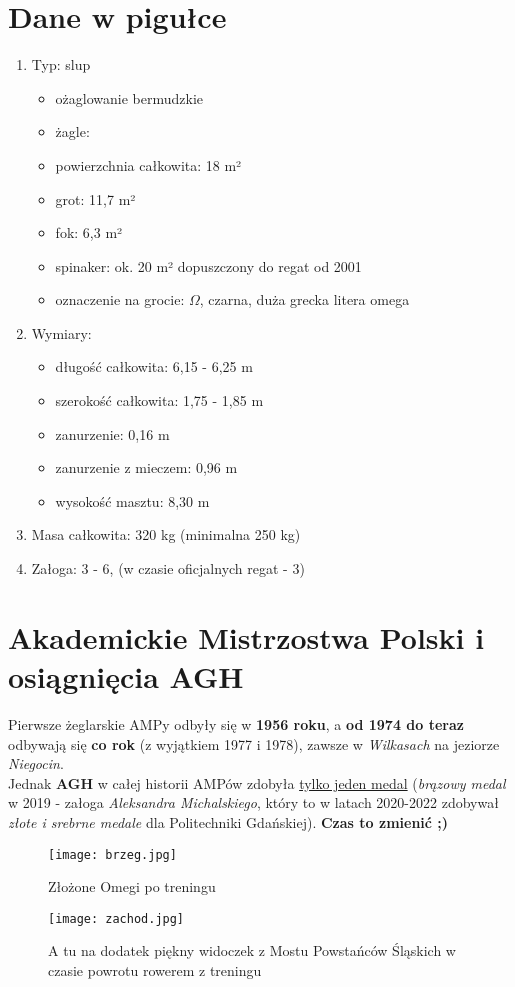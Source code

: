 \documentclass{article}
\begin{document}
\section{Dane w pigułce}
\begin{enumerate}
    \item Typ: slup
    \begin{itemize}
        \item ożaglowanie bermudzkie
        \item żagle:
        \item powierzchnia całkowita: 18 m²
        \item grot: 11,7 m²
        \item fok: 6,3 m²
        \item spinaker: ok. 20 m² dopuszczony do regat od 2001
        \item oznaczenie na grocie: $\Omega$, czarna, duża grecka litera omega
    \end{itemize}
    \item Wymiary:
    \begin{itemize}
        \item długość całkowita: 6,15 - 6,25 m
        \item szerokość całkowita: 1,75 - 1,85 m
        \item zanurzenie: 0,16 m
        \item zanurzenie z mieczem: 0,96 m
        \item wysokość masztu: 8,30 m
    \end{itemize}
    \item Masa całkowita: 320 kg (minimalna 250 kg)
    \item Załoga: 3 - 6, (w czasie oficjalnych regat - 3)
\end{enumerate}

\section{Akademickie Mistrzostwa Polski i osiągnięcia AGH}
Pierwsze żeglarskie AMPy odbyły się w \textbf{1956 roku}, a \textbf{od 1974 do teraz} odbywają się \textbf{co rok} (z wyjątkiem 1977 i 1978), zawsze w \emph{Wilkasach} na jeziorze \emph{Niegocin}.\\
Jednak \textbf{AGH} w całej historii AMPów zdobyła \underline{tylko jeden medal} (\emph{brązowy medal} w 2019 - załoga \emph{Aleksandra Michalskiego}, który to w latach 2020-2022 zdobywał \emph{złote i srebrne medale} dla Politechniki Gdańskiej). \textbf{Czas to zmienić ;)}

\begin{figure}[h]
    \centering 
    \texttt{[image: brzeg.jpg]}
    \caption{Złożone Omegi po treningu} 
\end{figure}

\begin{figure}[h]
    \centering 
    \texttt{[image: zachod.jpg]}
    \caption{A tu na dodatek piękny widoczek z Mostu Powstańców Śląskich w czasie powrotu rowerem z treningu} 
\end{figure}
\end{document}
